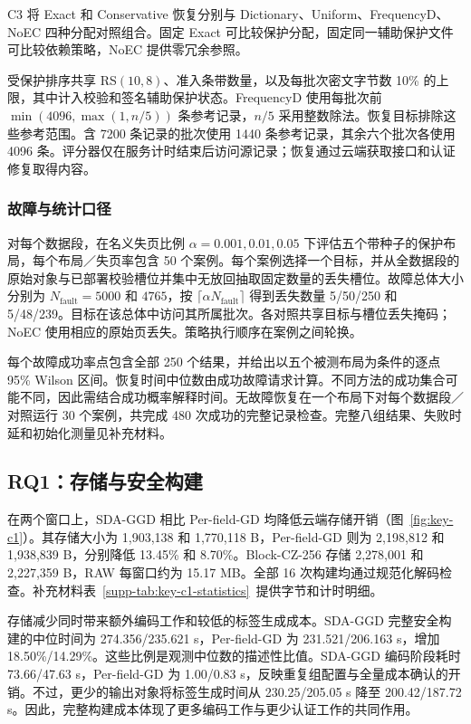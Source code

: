 \documentclass[10pt,journal]{IEEEtran}
\begin{document}
C3 将 Exact 和 Conservative 恢复分别与 Dictionary、Uniform、FrequencyD、NoEC 四种分配对照组合。固定 Exact 可比较保护分配，固定同一辅助保护文件可比较依赖策略，NoEC 提供零冗余参照。

受保护排序共享 RS$(10,8)$、准入条带数量，以及每批次密文字节数 10\% 的上限，其中计入校验和签名辅助保护状态。FrequencyD 使用每批次前 $\min(4096,\max(1,n/5))$ 条参考记录，$n/5$ 采用整数除法。恢复目标排除这些参考范围。含 7200 条记录的批次使用 1440 条参考记录，其余六个批次各使用 4096 条。评分器仅在服务计时结束后访问源记录；恢复通过云端获取接口和认证修复取得内容。

\subsubsection{故障与统计口径}
对每个数据段，在名义失页比例 $\alpha=0.001,0.01,0.05$ 下评估五个带种子的保护布局，每个布局／失页率包含 50 个案例。每个案例选择一个目标，并从全数据段的原始对象与已部署校验槽位并集中无放回抽取固定数量的丢失槽位。故障总体大小分别为 $N_{\mathrm{fault}}=5000$ 和 $4765$，按 $\lceil\alpha N_{\mathrm{fault}}\rceil$ 得到丢失数量 5/50/250 和 5/48/239。目标在该总体中访问其所属批次。各对照共享目标与槽位丢失掩码；NoEC 使用相应的原始页丢失。策略执行顺序在案例之间轮换。

每个故障成功率点包含全部 250 个结果，并给出以五个被测布局为条件的逐点 95\% Wilson 区间。恢复时间中位数由成功故障请求计算。不同方法的成功集合可能不同，因此需结合成功概率解释时间。无故障恢复在一个布局下对每个数据段／对照运行 30 个案例，共完成 480 次成功的完整记录检查。完整八组结果、失败时延和初始化测量见补充材料。

\subsection{RQ1：存储与安全构建}
在两个窗口上，SDA-GGD 相比 Per-field-GD 均降低云端存储开销（图~\ref{fig:key-c1}）。其存储大小为 1,903,138 和 1,770,118 B，Per-field-GD 则为 2,198,812 和 1,938,839 B，分别降低 13.45\% 和 8.70\%。Block-CZ-256 存储 2,278,001 和 2,227,359 B，RAW 每窗口约为 15.17 MB。全部 16 次构建均通过规范化解码检查。补充材料表~\ref*{supp-tab:key-c1-statistics}~提供字节和计时明细。

存储减少同时带来额外编码工作和较低的标签生成成本。SDA-GGD 完整安全构建的中位时间为 274.356/235.621 s，Per-field-GD 为 231.521/206.163 s，增加 18.50\%/14.29\%。这些比例是观测中位数的描述性比值。SDA-GGD 编码阶段耗时 73.66/47.63 s，Per-field-GD 为 1.00/0.83 s，反映重复组配置与全量成本确认的开销。不过，更少的输出对象将标签生成时间从 230.25/205.05 s 降至 200.42/187.72 s。因此，完整构建成本体现了更多编码工作与更少认证工作的共同作用。
\end{document}
